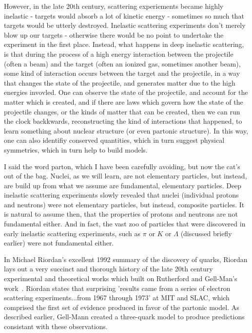 However, in the late 20th century, scattering experiements became highly
inelastic - targets would absorb a lot of kinetic energy - sometimes so much
that targets would be utterly destroyed. Inelastic scattering experiments don't
merely blow up our targets - otherwise there would be no point to undertake the
experiment in the first place. Instead, what happens in deep inelastic
scattering, is that during the process of a high energy interaction between the
projectile (often a beam) and the target (often an ionized gas, sometimes
another beam), some kind of interaction occurs between the target and the
projectile, in a way that changes the state of the projectile, and generates
matter due to the high energies invovled. One can observe the state of the
projectile, and account for the matter which is created, and if there are laws
which govern how the state of the projectile changes, or the kinds of matter
that can be created, then we can run the clock backkwards, reconstructing the
kind of interactions that happened, to learn something about nuclear structure
(or even partonic structure). In this way, one can also identifiy conserved
quantities, which in turn suggest physical symmetries, which in turn help to
build models.

I said the word parton, which I have been carefully avoiding, but now the cat's
out of the bag. Nuclei, as we will learn, are not elementary particles, but
instead, are build up from what we assume are fundamental, elementary particles.
Deep inelastic scattering experiments slowly revealed that nuclei (individual
protons and neutrons) were not elementary particles, but instead, composite
particles. It is natural to assume then, that the properties of protons and
neutrons are not fundamental either. And in fact, the vast zoo of particles that
were discovered in early inelastic scattering experiments, such as $\pi$ or $K$
or $\Lambda$ (discussed briefly earlier) were not fundamental either.

In Michael Riordan's excellent 1992 summary of the discovery of quarks, Riordan
lays out a very succinct and thorough history of the late 20th century
experimental and theoretical works which built on Rutherford and Gell-Man's
work~\cite{Riordan1992}. Riordan states that surprising 'results came from a
series of electron scattering experiments...from 1967 through 1973' at MIT and
SLAC, which comprised the first set of evidence produced in favor of the
partonic model. As described earlier, Gell-Mann created a three-quark model to
produce predictions consistant with these observations.

